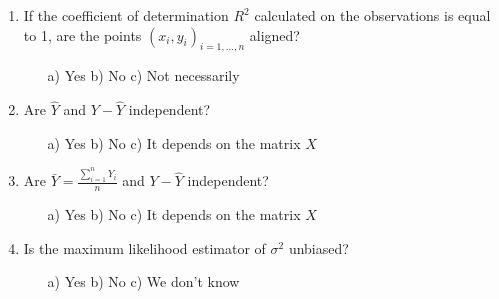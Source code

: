 \begin{exercise}[MCQ]
\begin{enumerate}
    \item If the coefficient of determination \(R^2\) calculated on the observations is equal to 1, are the points \((x_i, y_i)_{i=1,\ldots,n}\) aligned?
    \begin{itemize}
        \item[a)] Yes \quad b) No \quad c) Not necessarily
    \end{itemize}

    \item Are \(\hat{Y}\) and \(Y - \hat{Y}\) independent?
    \begin{itemize}
        \item[a)] Yes \quad b) No \quad c) It depends on the matrix \(X\)
    \end{itemize}

    \item Are \(\bar{Y} = \frac{\sum_{i=1}^n Y_i}{n}\) and \(Y - \hat{Y}\) independent?
    \begin{itemize}
        \item[a)] Yes \quad b) No \quad c) It depends on the matrix \(X\)
    \end{itemize}

    \item Is the maximum likelihood estimator of \(\sigma^2\) unbiased?
    \begin{itemize}
        \item[a)] Yes \quad b) No \quad c) We don't know
    \end{itemize}
\end{enumerate}
\end{exercise}

